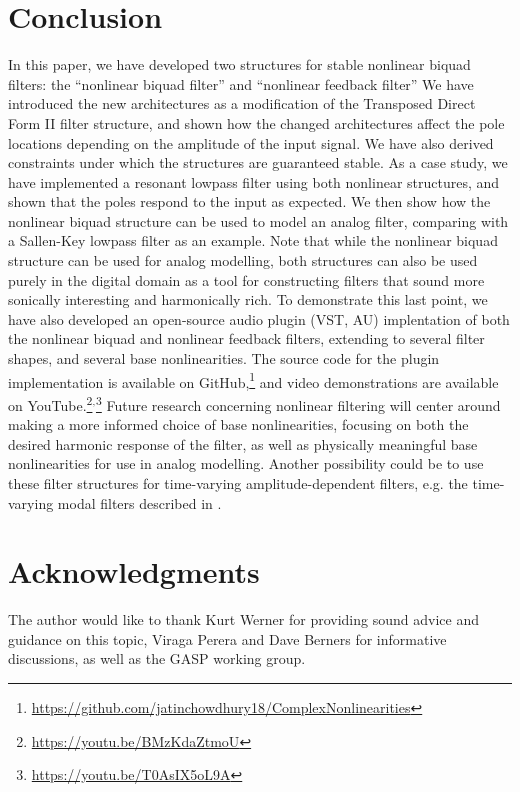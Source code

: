 \documentclass[twoside,a4paper]{article}
\begin{document}
\section{Conclusion}

In this paper, we have developed two structures for stable nonlinear biquad
filters: the ``nonlinear biquad filter'' and ``nonlinear feedback filter''
We have introduced the new architectures as a modification of the
Transposed Direct Form II filter structure, and shown
how the changed architectures affect the pole locations depending on
the amplitude of the input signal. We have also derived constraints under
which the structures are guaranteed stable.
\newline\newline
As a case study, we have implemented
a resonant lowpass filter using both nonlinear
structures, and shown that the
poles respond to the input as expected. We then show how the
nonlinear biquad structure can be used to model an analog
filter, comparing with a Sallen-Key lowpass filter as
an example. Note that while the nonlinear biquad structure
can be used for analog modelling, both structures can also be
used purely in the digital domain as a tool for constructing
filters that sound more sonically interesting and harmonically
rich.
\newline\newline
To demonstrate this last point, we have also developed an open-source
audio plugin (VST, AU) implentation of both the nonlinear biquad and
nonlinear feedback filters, extending to several filter shapes, and
several base nonlinearities.
The source code for the plugin implementation is available on
GitHub,\footnote{\url{https://github.com/jatinchowdhury18/ComplexNonlinearities}}
and video demonstrations are available on
YouTube.\footnote{\url{https://youtu.be/BMzKdaZtmoU}}$^{,}$\footnote{\url{https://youtu.be/T0AsIX5oL9A}}
\newline\newline
Future research concerning nonlinear filtering will center around making a
more informed choice of base nonlinearities, focusing on both the desired
harmonic response of the filter, as well as physically meaningful base
nonlinearities for use in analog modelling. Another possibility could be
to use these filter structures for time-varying amplitude-dependent
filters, e.g. the time-varying modal filters described in \cite{mark-nlmodal}.

\section{Acknowledgments}

The author would like to thank Kurt Werner for providing sound advice and
guidance on this topic, Viraga Perera and Dave Berners for informative
discussions, as well as the GASP working group.

\nocite{*}


\end{document}
